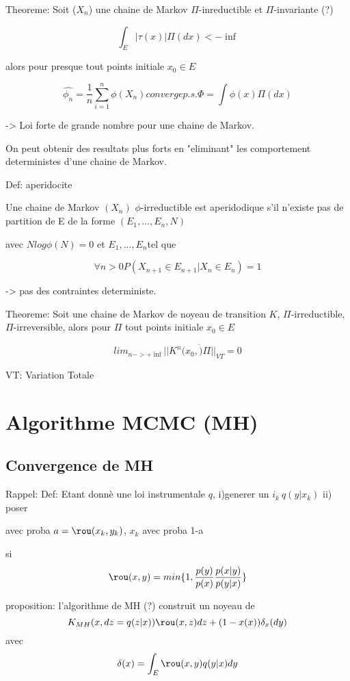 \documentclass{article}
\begin{document}
Theoreme: Soit ($X_n$) une chaine de Markov $\Pi$-inreductible et $\Pi$-invariante (?)


\begin{equation}
\int_E |\tau(x)|\Pi(dx)<-\inf
\end{equation}

alors pour presque tout points initiale $x_0\in E$


\begin{equation}
\hat{\phi_n}=\frac{1}{n}\sum_{i=1}^{n}\phi(X_n) converge p.s. \Phi=\int \phi(x)\Pi(dx)
\end{equation}

-> Loi forte de grande nombre pour une chaine de Markov.

On peut obtenir des resultats plus forts en "eliminant" les comportement deterministes d'une chaine de Markov.

Def: aperidocite

Une chaine de Markov $(X_n)$ $\phi$-irreductible est aperidodique s'il n'existe pas de partition de E de la forme $(E_1,...,E_n,N)$

avec $Nlog\phi(N)=0$ et $E_1,...,E_n$tel que

\begin{equation}
\forall n>0 P(X_{n+1}\in E_{n+1}|X_n\in E_n) = 1
\end{equation}

-> pas des contraintes deterministe.

Theoreme: Soit une chaine de Markov de noyeau de transition $K$, $\Pi$-irreductible, $\Pi$-irreversible, alors pour $\Pi$ tout points initiale $x_0 \in E$

\begin{equation}
lim_{n->+\inf} ||K^n (x_0, \dot)\Pi||_{VT}=0
\end{equation}

VT: Variation Totale

\section{Algorithme MCMC (MH)}
\subsection{Convergence de MH}
Rappel:
Def: Etant donn\`e une loi instrumentale $q$, 
i)generer un $i_k~q(y|x_k)$
ii) poser

\begin{equation}

\end{equation} 
avec proba $a=\rou(x_k,y_k)$, $x_k$ avec proba 1-a

si 
\begin{equation}
\rou(x,y) = min\{1,\frac{p(y)}{p(x)}\frac{p(x|y)}{p(y|x)}\}
\end{equation}

proposition: 
l'algorithme de MH (?) construit un noyeau de
\begin{equation}
K_{MH}(x,dz=q(z|x))\rou(x,z)dz+(1-x(x))\delta_x(dy)
\end{equation}
avec
\begin{equation}
\delta(x)=\int_E \rou(x,y)q(y|x)dy
\end{equation}
\end{document}
